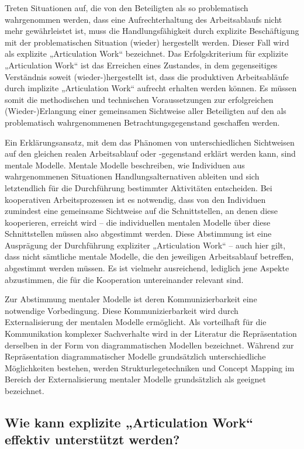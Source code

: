 Treten Situationen auf, die von den Beteiligten als so problematisch wahrgenommen werden, dass eine Aufrechterhaltung des Arbeitsablaufs nicht mehr gewährleistet ist, muss die Handlungsfähigkeit durch explizite Beschäftigung mit der problematischen Situation (wieder) hergestellt werden. Dieser Fall wird als explizite „Articulation Work“ bezeichnet. Das Erfolgskriterium für explizite „Articulation Work“ ist das Erreichen eines Zustandes, in dem gegenseitiges Verständnis soweit (wieder-)hergestellt ist, dass die produktiven Arbeitsabläufe durch implizite „Articulation Work“ aufrecht erhalten werden können. Es müssen somit die methodischen und technischen Voraussetzungen zur erfolgreichen (Wieder-)Erlangung einer gemeinsamen Sichtweise aller Beteiligten auf den als problematisch wahrgenommenen Betrachtungsgegenstand geschaffen werden.

Ein Erklärungsansatz, mit dem das Phänomen von unterschiedlichen Sichtweisen auf den gleichen realen Arbeitsablauf oder -gegenstand erklärt werden kann, sind mentale Modelle. Mentale Modelle beschreiben, wie Individuen aus wahrgenommenen Situationen Handlungsalternativen ableiten und sich letztendlich für die Durchführung bestimmter Aktivitäten entscheiden. Bei kooperativen Arbeitsprozessen ist es notwendig, dass von den Individuen zumindest eine gemeinsame Sichtweise auf die Schnittstellen, an denen diese kooperieren, erreicht wird -- die individuellen mentalen Modelle über diese Schnittstellen müssen also abgestimmt werden. Diese Abstimmung ist eine Ausprägung der Durchführung expliziter „Articulation Work“ -- auch hier gilt, dass nicht sämtliche mentale Modelle, die den jeweiligen Arbeitsablauf betreffen, abgestimmt werden müssen. Es ist vielmehr ausreichend, lediglich jene Aspekte abzustimmen, die für die Kooperation untereinander relevant sind.

Zur Abstimmung mentaler Modelle ist deren Kommunizierbarkeit eine notwendige Vorbedingung. Diese Kommunizierbarkeit wird durch Externalisierung der mentalen Modelle ermöglicht. Als vorteilhaft für die Kommunikation komplexer Sachverhalte wird in der Literatur die Repräsentation derselben in der Form von diagrammatischen Modellen bezeichnet. Während zur Repräsentation diagrammatischer Modelle grundsätzlich unterschiedliche Möglichkeiten bestehen, werden Strukturlegetechniken und Concept Mapping im Bereich der Externalisierung mentaler Modelle grundsätzlich als geeignet bezeichnet. 

\subsection{Wie kann explizite „Articulation Work“ effektiv unterstützt werden?}

